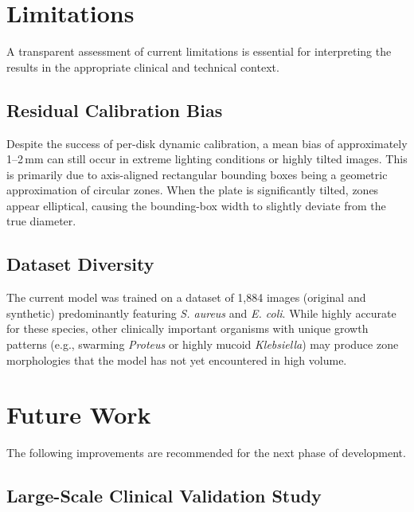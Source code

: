 \section{Limitations}
\label{sec:limitations}

A transparent assessment of current limitations is essential
for interpreting the results in the appropriate clinical and technical context.

\subsection{Residual Calibration Bias}

Despite the success of per-disk dynamic calibration, a mean bias of approximately 1--2\,mm can still occur in extreme lighting conditions or highly tilted images.
This is primarily due to axis-aligned rectangular bounding boxes being a geometric approximation of circular zones.
When the plate is significantly tilted, zones appear elliptical, causing the bounding-box width to slightly deviate from the true diameter.

\subsection{Dataset Diversity}

The current model was trained on a dataset of 1,884 images (original and synthetic) predominantly featuring \textit{S. aureus} and \textit{E. coli}.
While highly accurate for these species, other clinically important organisms with unique growth patterns (e.g., swarming \textit{Proteus} or highly mucoid \textit{Klebsiella}) may produce zone morphologies that the model has not yet encountered in high volume.

\section{Future Work}
\label{sec:future_work}

The following improvements are recommended for the next phase of development.

\subsection{Large-Scale Clinical Validation Study}

